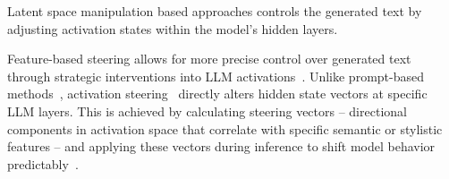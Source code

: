 Latent space manipulation based approaches  controls the generated text by adjusting activation states within the model’s hidden layers.




















Feature-based steering allows for more precise control over generated text through strategic interventions into LLM activations~\cite{Dathathri_Madotto_Lan_Hung_Frank_Molino_Yosinski_Liu_2019,Liu_Sap_Lu_Swayamdipta_Bhagavatula_Smith_Choi_2021,Khalifa_ElSahar_Dymetman_2020}. Unlike prompt-based methods~\cite{wallace2404instruction}, activation steering~\cite{turner2023activation} directly alters hidden state vectors at specific LLM layers. This is achieved by calculating steering vectors – directional components in activation space that correlate with specific semantic or stylistic features – and applying these vectors during inference to shift model behavior predictably~\cite{hernandez2023inspecting,subramani2022extracting,sun2024massive}.

















